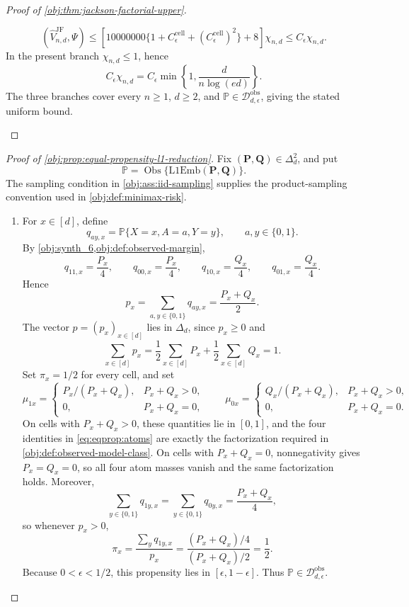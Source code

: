 \begin{proof}[Proof of \cref{obj:thm:jackson-factorial-upper}]
\begin{enumerate}
\[(\widehat V_{n,d}^{\mathrm{JF}},\Psi)
\le
\left[
10000000
\{1+C_{\epsilon}^{\mathrm{cell}}+(C_{\epsilon}^{\mathrm{cell}})^2\}
+8
\right]\chi_{n,d}
\le
C_\epsilon\chi_{n,d}.
\]
In the present branch \(\chi_{n,d}\le1\), hence
\[
C_\epsilon\chi_{n,d}
=
C_\epsilon
\min\left\{1,\frac{d}{n\log(ed)}\right\}.
\]
The three branches cover every \(n\ge1\), \(d\ge2\), and
\(\mathbb P\in\mathcal D_{d,\epsilon}^{\mathrm{obs}}\), giving the stated
uniform bound.
\end{enumerate}
\end{proof}

\begin{proof}[Proof of \cref{obj:prop:equal-propensity-l1-reduction}]
Fix \((\mathbf P,\mathbf Q)\in\Delta_d^2\), and put
\[
\mathbb P=\operatorname{Obs}\{\mathrm{L1Emb}(\mathbf P,\mathbf Q)\}.
\]
The sampling condition in \cref{obj:ass:iid-sampling} supplies the product-sampling convention used in \cref{obj:def:minimax-risk}.

\begin{enumerate}
\item For \(x\in[d]\), define
\[
q_{ay,x}=\mathbb P\{X=x,A=a,Y=y\},
\qquad a,y\in\{0,1\}.
\]
By \cref{obj:synth_6,obj:def:observed-margin},
\begin{equation}
\label{eq:eqprop:atoms}
q_{11,x}=\frac{P_x}{4},
\qquad
q_{00,x}=\frac{P_x}{4},
\qquad
q_{10,x}=\frac{Q_x}{4},
\qquad
q_{01,x}=\frac{Q_x}{4}.
\end{equation}
Hence
\[
p_x=\sum_{a,y\in\{0,1\}}q_{ay,x}
=\frac{P_x+Q_x}{2}.
\]
The vector \(p=(p_x)_{x\in[d]}\) lies in \(\Delta_d\), since \(p_x\ge0\) and
\[
\sum_{x\in[d]}p_x
=
\frac12\sum_{x\in[d]}P_x+\frac12\sum_{x\in[d]}Q_x
=1.
\]
Set \(\pi_x=1/2\) for every cell, and set
\[
\mu_{1x}=
\begin{cases}
P_x/(P_x+Q_x),& P_x+Q_x>0,\\
0,& P_x+Q_x=0,
\end{cases}
\qquad
\mu_{0x}=
\begin{cases}
Q_x/(P_x+Q_x),& P_x+Q_x>0,\\
0,& P_x+Q_x=0.
\end{cases}
\]
On cells with \(P_x+Q_x>0\), these quantities lie in \([0,1]\), and the four identities in
\cref{eq:eqprop:atoms} are exactly the factorization required in \cref{obj:def:observed-model-class}.
On cells with \(P_x+Q_x=0\), nonnegativity gives \(P_x=Q_x=0\), so all four atom masses vanish and
the same factorization holds. Moreover,
\[
\sum_{y\in\{0,1\}}q_{1y,x}
=
\sum_{y\in\{0,1\}}q_{0y,x}
=
\frac{P_x+Q_x}{4},
\]
so whenever \(p_x>0\),
\[
\pi_x
=
\frac{\sum_y q_{1y,x}}{p_x}
=
\frac{(P_x+Q_x)/4}{(P_x+Q_x)/2}
=
\frac12.
\]
Because \(0<\epsilon<1/2\), this propensity lies in \([\epsilon,1-\epsilon]\). Thus
\(\mathbb P\in\mathcal D_{d,\epsilon}^{\mathrm{obs}}\). %


\end{enumerate}
\end{proof}
